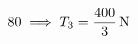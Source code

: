 \documentclass[preview]{standalone}
\begin{document}
\begin{align*}
\special{dvisvgm:raw <g id='unique000'>}80 \implies T_3 = \frac{400}{3}\,\mathrm{N}\special{dvisvgm:raw </g>}
\end{align*}
\end{document}
